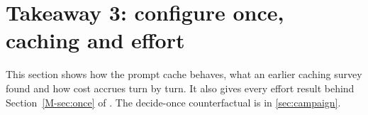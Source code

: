 \section{Takeaway 3: configure once, caching and effort}\label{sec:d}

This section shows how the prompt cache behaves, what an earlier caching survey found and how cost accrues turn by
turn. It also gives every effort result behind Section~\ref{M-sec:once} of \mainpaper{}. The decide-once counterfactual is in
\cref{sec:campaign}.






